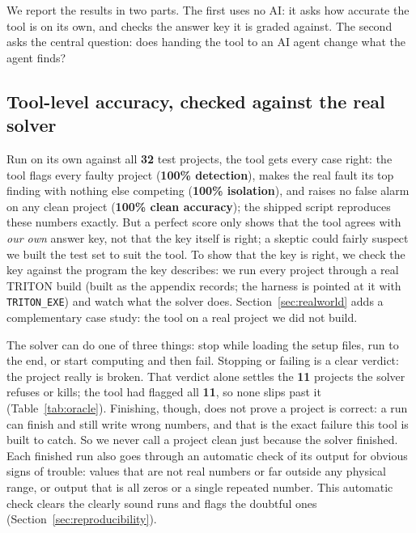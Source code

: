 \documentclass[conference]{IEEEtran}
\begin{document}
We report the results in two parts. The first uses no AI: it asks how accurate the tool is on
its own, and checks the answer key it is graded against. The second asks the central
question: does handing the tool to an AI agent change what the agent finds?

\subsection{Tool-level accuracy, checked against the real solver}
\label{sec:oracle}
Run on its own against all \textbf{32} test projects, the tool gets every case right: the tool
flags every faulty project (\textbf{100\% detection}), makes the real fault its top finding with
nothing else competing (\textbf{100\% isolation}), and raises no false alarm on any clean project
(\textbf{100\% clean accuracy}); the shipped script reproduces these numbers exactly.
But a perfect score only shows
that the tool agrees with \emph{our own} answer key, not that the key itself is right; a skeptic
could fairly suspect we built the test set to suit the tool.
To show that the key is right, we check the key against the program the key describes: we run
every project through a real TRITON build (built as the appendix records; the harness is pointed at
it with \texttt{TRITON\_EXE}) and watch what the solver does. Section~\ref{sec:realworld} adds a
complementary case study: the tool on a real project we did not build.

The solver can do one of three things: stop while loading the setup files, run to the end, or
start computing and then fail. Stopping or failing is a clear verdict: the project really is
broken. That verdict alone settles the \textbf{11} projects the solver refuses or kills; the tool
had flagged all \textbf{11}, so none slips past it (Table~\ref{tab:oracle}).
Finishing, though, does not prove a project is correct: a run can finish and still write wrong
numbers, and that is the exact failure this tool is built to catch. So we never call a project
clean just because the solver finished. Each finished run also goes through an automatic check of
its output for obvious signs of trouble: values that are not real numbers or far outside
any physical range, or output that is all zeros or a single repeated number. This automatic check
clears the clearly sound runs and flags the doubtful ones (Section~\ref{sec:reproducibility}).
\end{document}
